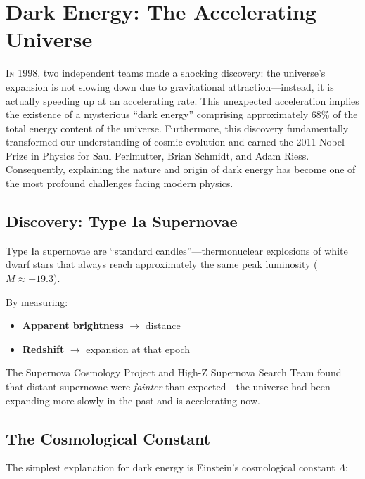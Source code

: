 \documentclass[11pt,a4paper]{article}
\begin{document}
\newpage

\section{Dark Energy: The Accelerating Universe}
\label{sec:darkenergy}

\lettrine[lines=3, loversize=0.1, nindent=0.5em]{I}{n} 1998, two independent teams made a shocking discovery: the universe's expansion is not slowing down due to gravitational attraction---instead, it is actually speeding up at an accelerating rate. This unexpected acceleration implies the existence of a mysterious ``dark energy'' comprising approximately 68\% of the total energy content of the universe. Furthermore, this discovery fundamentally transformed our understanding of cosmic evolution and earned the 2011 Nobel Prize in Physics for Saul Perlmutter, Brian Schmidt, and Adam Riess. Consequently, explaining the nature and origin of dark energy has become one of the most profound challenges facing modern physics.

\subsection{Discovery: Type Ia Supernovae}

Type Ia supernovae are ``standard candles''---thermonuclear explosions of white dwarf stars that always reach approximately the same peak luminosity ($M \approx -19.3$).

By measuring:
\begin{itemize}[noitemsep]
    \item \textbf{Apparent brightness} $\rightarrow$ distance
    \item \textbf{Redshift} $\rightarrow$ expansion at that epoch
\end{itemize}

The Supernova Cosmology Project and High-Z Supernova Search Team found that distant supernovae were \textit{fainter} than expected---the universe had been expanding more slowly in the past and is accelerating now.

\subsection{The Cosmological Constant}

The simplest explanation for dark energy is Einstein's cosmological constant $\Lambda$:
\end{document}
